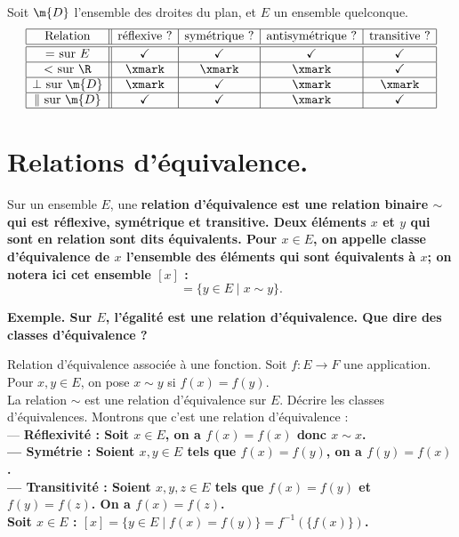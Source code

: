 \documentclass[11pt]{article}
\begin{document}
\begin{ex}{}{}
    Soit $\m{D}$ l'ensemble des droites du plan, et $E$ un ensemble quelconque.
    \begin{eqnarray*}
        \begin{array}{|c||c|c|c|c|}
            \hline
            $Relation$ & $réflexive ?$ & $symétrique ?$ & $antisymétrique ?$ & $transitive ?$\\
            \hline
            \hline
            = $ sur $ E & \checkmark & \checkmark & \checkmark & \checkmark\\
            \hline
            < $ sur $ \R & $\xmark$ & $\xmark$ & $\xmark$ & \checkmark\\
            \hline
            \perp $ sur $ \m{D} & $\xmark$ & \checkmark & $\xmark$ & $\xmark$\\
            \hline
            \| $ sur $ \m{D} & \checkmark & \checkmark & $\xmark$ & \checkmark\\
            \hline
        \end{array}
    \end{eqnarray*}
\end{ex}

\section{Relations d'équivalence.}

\begin{defi}{}{}
    Sur un ensemble $E$, une \bf{relation d'équivalence} est une relation binaire $\sim$ qui est réflexive, symétrique et transitive.\n
    Deux éléments $x$ et $y$ qui sont en relation sont dits \bf{équivalents}.\n
    Pour $x\in E$, on appelle \bf{classe d'équivalence} de $x$ l'ensemble des éléments qui sont équivalents à $x$; on notera ici cet ensemble $[x]$ :
    \begin{equation*}
        [x] = \{y\in E \mid x \sim y\}.
    \end{equation*}
\end{defi}

\bf{Exemple.} Sur $E$, l'égalité est une relation d'équivalence. Que dire des classes d'équivalence ?

\begin{ex}{Relation d'équivalence associée à une fonction.}{}
    Soit $f:E\to F$ une application. Pour $x,y\in E$, on pose $x\sim y$ si $f(x)=f(y)$.\\
    La relation $\sim$ est une relation d'équivalence sur $E$. Décrire les classes d'équivalences.
    \tcblower
    Montrons que c'est une relation d'équivalence :\\
    --- \bf{Réflexivité :} Soit $x\in E$, on a $f(x)=f(x)$ donc $x\sim x$.\\
    --- \bf{Symétrie :} Soient $x,y\in E$ tels que $f(x)=f(y)$, on a $f(y)=f(x)$.\\
    --- \bf{Transitivité :} Soient $x,y,z\in E$ tels que $f(x)=f(y)$ et $f(y)=f(z)$. On a $f(x)=f(z)$.\\
    Soit $x\in E$ : $[x]=\{y\in E \mid f(x) = f(y)\}=f^{-1}(\{f(x)\})$.
\end{ex}
\end{document}
